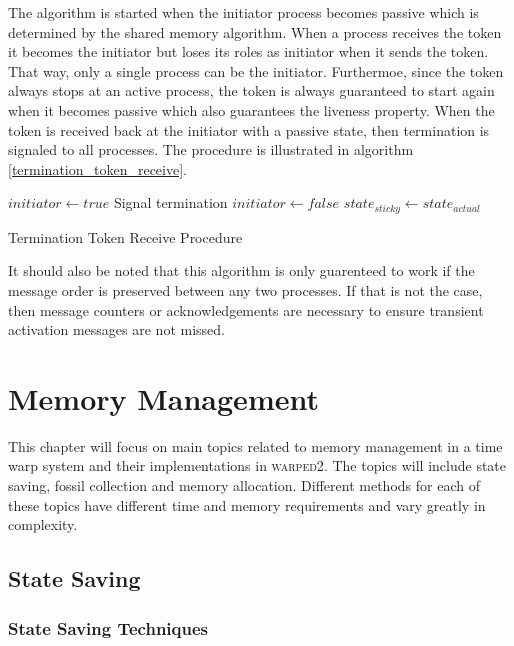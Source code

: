 \documentclass[11pt]{book}
\begin{document}
The algorithm is started when the initiator process becomes passive which is determined by
the shared memory algorithm. When a process receives the token it becomes the initiator
but loses its roles as initiator when it sends the token. That way, only a single process
can be the initiator. Furthermoe, since the token always stops at an active process, the
token is always guaranteed to start again when it becomes passive which also guarantees
the liveness property. When the token is received back at the initiator with a passive
state, then termination is signaled to all processes. The procedure is illustrated in
algorithm \ref{termination_token_receive}.

\begin{algorithm}
\DontPrintSemicolon
\SetAlgoVlined
{}
    $initiator \gets true$\;
     {
         {
            Signal termination\;
        }
    }  {
        $initiator \gets false$\;
        \;
    }
    $state_{sticky} \gets state_{actual}$\;
\caption{Termination Token Receive Procedure}\label{termination_token_receive}
\end{algorithm}

It should also be noted that this algorithm is only guarenteed to work if the message order
is preserved between any two processes. If that is not the case, then message counters or
acknowledgements are necessary to ensure transient activation messages are not missed.



\chapter{Memory Management}\label{memory_management}

This chapter will focus on main topics related to memory management in a time warp system
and their implementations in \textsc{warped2}. The topics will include state saving, fossil
collection and memory allocation. Different methods for each of these topics have different
time and memory requirements and vary greatly in complexity.

\section{State Saving}

\subsection{State Saving Techniques}
\end{document}
